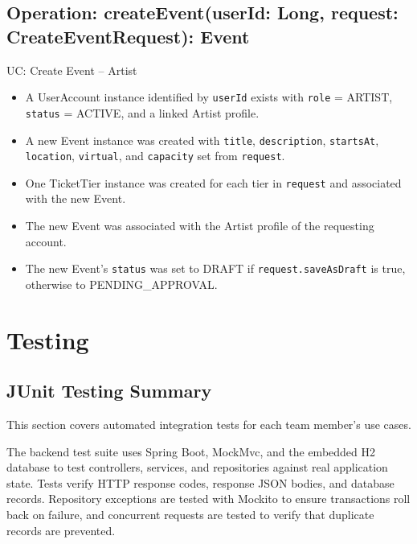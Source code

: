 \documentclass[11pt]{report}
\begin{document}
\section*{Operation: createEvent(userId: Long, request: CreateEventRequest): Event}
\begin{description}[leftmargin=2.8cm, style=nextline]
  \item[Cross Reference] UC: Create Event -- Artist
  \item[Preconditions]
    \begin{itemize}
      \item A UserAccount instance identified by \texttt{userId} exists with \texttt{role} = ARTIST, \texttt{status} = ACTIVE, and a linked Artist profile.
    \end{itemize}
  \item[Postconditions]
    \begin{itemize}
      \item A new Event instance was created with \texttt{title}, \texttt{description}, \texttt{startsAt}, \texttt{location}, \texttt{virtual}, and \texttt{capacity} set from \texttt{request}.
      \item One TicketTier instance was created for each tier in \texttt{request} and associated with the new Event.
      \item The new Event was associated with the Artist profile of the requesting account.
      \item The new Event's \texttt{status} was set to DRAFT if \texttt{request.saveAsDraft} is true, otherwise to PENDING\_APPROVAL.
    \end{itemize}
\end{description}

\chapter{Testing}
\section{JUnit Testing Summary}
This section covers automated integration tests for each team member's use cases.

The backend test suite uses Spring Boot, MockMvc, and the embedded H2 database to test controllers, services, and repositories against real application state. Tests verify HTTP response codes, response JSON bodies, and database records. Repository exceptions are tested with Mockito to ensure transactions roll back on failure, and concurrent requests are tested to verify that duplicate records are prevented.
\end{document}
